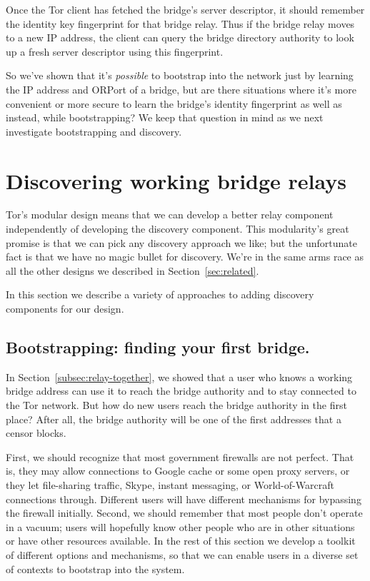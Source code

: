 \documentclass{llncs}
\begin{document}
Once the Tor client has fetched the bridge's server descriptor, it should
remember the identity key fingerprint for that bridge relay. Thus if
the bridge relay moves to a new IP address, the client can query the
bridge directory authority to look up a fresh server descriptor using
this fingerprint.

So we've shown that it's \emph{possible} to bootstrap into the network
just by learning the IP address and ORPort of a bridge, but are there
situations where it's more convenient or more secure to learn the bridge's
identity fingerprint as well as instead, while bootstrapping? We keep
that question in mind as we next investigate bootstrapping and discovery.

\section{Discovering working bridge relays}
\label{sec:discovery}

Tor's modular design means that we can develop a better relay component
independently of developing the discovery component. This modularity's
great promise is that we can pick any discovery approach we like; but the
unfortunate fact is that we have no magic bullet for discovery. We're
in the same arms race as all the other designs we described in
Section~\ref{sec:related}.

In this section we describe a variety of approaches to adding discovery
components for our design.

\subsection{Bootstrapping: finding your first bridge.}
\label{subsec:first-bridge}

In Section~\ref{subsec:relay-together}, we showed that a user who knows
a working bridge address can use it to reach the bridge authority and
to stay connected to the Tor network. But how do new users reach the
bridge authority in the first place? After all, the bridge authority
will be one of the first addresses that a censor blocks.

First, we should recognize that most government firewalls are not
perfect. That is, they may allow connections to Google cache or some
open proxy servers, or they let file-sharing traffic, Skype, instant
messaging, or World-of-Warcraft connections through. Different users will
have different mechanisms for bypassing the firewall initially. Second,
we should remember that most people don't operate in a vacuum; users will
hopefully know other people who are in other situations or have other
resources available. In the rest of this section we develop a toolkit
of different options and mechanisms, so that we can enable users in a
diverse set of contexts to bootstrap into the system.
\end{document}
